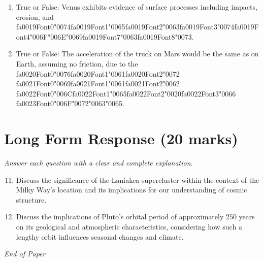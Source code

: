 \documentclass[12pt]{article}
\begin{document}
\begin{enumerate}[label=\arabic*.]
\item True or False: Venus exhibits evidence of surface processes including impacts, erosion, and {\csname fa0019Font0\endcsname\char"0074}{\csname fa0019Font1\endcsname\char"0065}{\csname fa0019Font2\endcsname\char"0063}{\csname fa0019Font3\endcsname\char"0074}{\csname fa0019Font4\endcsname\char"006F}{\char"006E}{\char"0069}{\csname fa0019Font7\endcsname\char"0063}{\csname fa0019Font8\endcsname\char"0073}.
\item True or False: The acceleration of the truck on Mars would be the same as on Earth, assuming no friction, due to the {\csname fa0020Font0\endcsname\char"0076}{\csname fa0020Font1\endcsname\char"0061}{\csname fa0020Font2\endcsname\char"0072} {\csname fa0021Font0\endcsname\char"0069}{\csname fa0021Font1\endcsname\char"0061}{\csname fa0021Font2\endcsname\char"0062} {\csname fa0022Font0\endcsname\char"006C}{\csname fa0022Font1\endcsname\char"0065}{\csname fa0022Font2\endcsname\char"0020}{\csname fa0022Font3\endcsname\char"0066} {\csname fa0023Font0\endcsname\char"006F}{\char"0072}{\char"0063}{\char"0065}.
\end{enumerate}

\section*{Long Form Response (20 marks)}
\textit{Answer each question with a clear and complete explanation.}
\begin{enumerate}[label=\arabic*.]
\setcounter{enumi}{10}
\item Discuss the significance of the Laniakea supercluster within the context of the Milky
Way's location and its implications for our understanding of cosmic structure.
\item Discuss the implications of Pluto's orbital period of approximately 250 years on its
geological and atmospheric characteristics, considering how such a lengthy orbit
influences seasonal changes and climate.
\end{enumerate}

\vfill
\noindent\textit{End of Paper}
\end{document}
